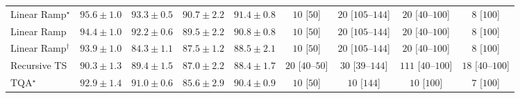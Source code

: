 \begin{tabular}{l|cccc|cccc|}
Linear Ramp$^\star$ & {\cellcolor[HTML]{005530}} \color[HTML]{F1F1F1} $95.6\pm 1.0$ & {\cellcolor[HTML]{006435}} \color[HTML]{F1F1F1} $93.3\pm 0.5$ & {\cellcolor[HTML]{0B713B}} \color[HTML]{F1F1F1} $90.7\pm 2.2$ & {\cellcolor[HTML]{076D39}} \color[HTML]{F1F1F1} $91.4\pm 0.8$ & {\cellcolor[HTML]{FFF6F2}} \color[HTML]{000000} $10$ [$50$] & {\cellcolor[HTML]{FFF3EF}} \color[HTML]{000000} $20$ [$105$--$144$] & {\cellcolor[HTML]{FFF3EF}} \color[HTML]{000000} $20$ [$40$--$100$] & {\cellcolor[HTML]{FFF6F2}} \color[HTML]{000000} $8$ [$100$] \\
Linear Ramp & {\cellcolor[HTML]{005D33}} \color[HTML]{F1F1F1} $94.4\pm 1.0$ & {\cellcolor[HTML]{026A38}} \color[HTML]{F1F1F1} $92.2\pm 0.6$ & {\cellcolor[HTML]{13773D}} \color[HTML]{F1F1F1} $89.5\pm 2.2$ & {\cellcolor[HTML]{0B713B}} \color[HTML]{F1F1F1} $90.8\pm 0.8$ & {\cellcolor[HTML]{FFF6F2}} \color[HTML]{000000} $10$ [$50$] & {\cellcolor[HTML]{FFF3EF}} \color[HTML]{000000} $20$ [$105$--$144$] & {\cellcolor[HTML]{FFF3EF}} \color[HTML]{000000} $20$ [$40$--$100$] & {\cellcolor[HTML]{FFF6F2}} \color[HTML]{000000} $8$ [$100$] \\
Linear Ramp$^\dagger$ & {\cellcolor[HTML]{006034}} \color[HTML]{F1F1F1} $93.9\pm 1.0$ & {\cellcolor[HTML]{30954F}} \color[HTML]{F1F1F1} $84.3\pm 1.1$ & {\cellcolor[HTML]{1F8142}} \color[HTML]{F1F1F1} $87.5\pm 1.2$ & {\cellcolor[HTML]{197C40}} \color[HTML]{F1F1F1} $88.5\pm 2.1$ & {\cellcolor[HTML]{FFF6F2}} \color[HTML]{000000} $10$ [$50$] & {\cellcolor[HTML]{FFF3EF}} \color[HTML]{000000} $20$ [$105$--$144$] & {\cellcolor[HTML]{FFF3EF}} \color[HTML]{000000} $20$ [$40$--$100$] & {\cellcolor[HTML]{FFF6F2}} \color[HTML]{000000} $8$ [$100$] \\
Recursive TS & {\cellcolor[HTML]{0E743C}} \color[HTML]{F1F1F1} $90.3\pm 1.3$ & {\cellcolor[HTML]{14783E}} \color[HTML]{F1F1F1} $89.4\pm 1.5$ & {\cellcolor[HTML]{228343}} \color[HTML]{F1F1F1} $87.0\pm 2.2$ & {\cellcolor[HTML]{197C40}} \color[HTML]{F1F1F1} $88.4\pm 1.7$ & {\cellcolor[HTML]{FFF3EF}} \color[HTML]{000000} $20$ [$40$--$50$] & {\cellcolor[HTML]{FEF1ED}} \color[HTML]{000000} $30$ [$39$--$144$] & {\cellcolor[HTML]{FDDDD9}} \color[HTML]{000000} $111$ [$40$--$100$] & {\cellcolor[HTML]{FFF3F0}} \color[HTML]{000000} $18$ [$40$--$100$] \\
TQA$^\star$ & {\cellcolor[HTML]{006636}} \color[HTML]{F1F1F1} $92.9\pm 1.4$ & {\cellcolor[HTML]{0A703A}} \color[HTML]{F1F1F1} $91.0\pm 0.6$ & {\cellcolor[HTML]{2A8D49}} \color[HTML]{F1F1F1} $85.6\pm 2.9$ & {\cellcolor[HTML]{0D733C}} \color[HTML]{F1F1F1} $90.4\pm 0.9$ & {\cellcolor[HTML]{FFF6F2}} \color[HTML]{000000} $10$ [$50$] & {\cellcolor[HTML]{FFF6F2}} \color[HTML]{000000} $10$ [$144$] & {\cellcolor[HTML]{FFF6F2}} \color[HTML]{000000} $10$ [$100$] & {\cellcolor[HTML]{FFF6F2}} \color[HTML]{000000} $7$ [$100$] \\

\end{tabular}
